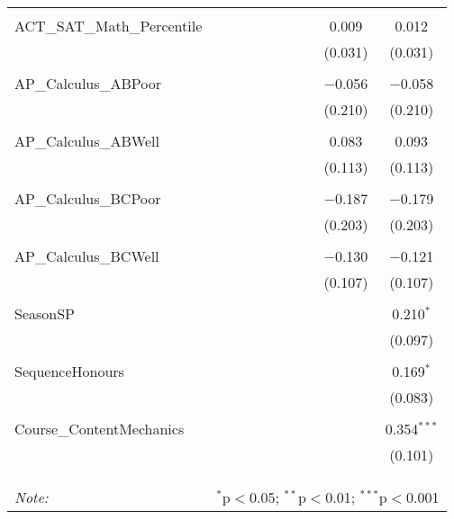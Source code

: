 \begin{table}[!htbp]
\begin{tabular}{@{\extracolsep{5pt}}lccccccccc}
  & & & & & & & & & \\ 
 ACT\_SAT\_Math\_Percentile &  &  &  &  &  &  &  & 0.009 & 0.012 \\ 
  &  &  &  &  &  &  &  & (0.031) & (0.031) \\ 
  & & & & & & & & & \\ 
 AP\_Calculus\_ABPoor &  &  &  &  &  &  &  & $-$0.056 & $-$0.058 \\ 
  &  &  &  &  &  &  &  & (0.210) & (0.210) \\ 
  & & & & & & & & & \\ 
 AP\_Calculus\_ABWell &  &  &  &  &  &  &  & 0.083 & 0.093 \\ 
  &  &  &  &  &  &  &  & (0.113) & (0.113) \\ 
  & & & & & & & & & \\ 
 AP\_Calculus\_BCPoor &  &  &  &  &  &  &  & $-$0.187 & $-$0.179 \\ 
  &  &  &  &  &  &  &  & (0.203) & (0.203) \\ 
  & & & & & & & & & \\ 
 AP\_Calculus\_BCWell &  &  &  &  &  &  &  & $-$0.130 & $-$0.121 \\ 
  &  &  &  &  &  &  &  & (0.107) & (0.107) \\ 
  & & & & & & & & & \\ 
 SeasonSP &  &  &  &  &  &  &  &  & 0.210$^{*}$ \\ 
  &  &  &  &  &  &  &  &  & (0.097) \\ 
  & & & & & & & & & \\ 
 SequenceHonours &  &  &  &  &  &  &  &  & 0.169$^{*}$ \\ 
  &  &  &  &  &  &  &  &  & (0.083) \\ 
  & & & & & & & & & \\ 
 Course\_ContentMechanics &  &  &  &  &  &  &  &  & 0.354$^{***}$ \\ 
  &  &  &  &  &  &  &  &  & (0.101) \\ 
  & & & & & & & & & \\ 
\hline \\[-1.8ex] 
\hline 
\hline \\[-1.8ex] 
\textit{Note:}  & \multicolumn{9}{r}{$^{*}$p$<$0.05; $^{**}$p$<$0.01; $^{***}$p$<$0.001} \\ 
\end{tabular} 
\end{table} 
